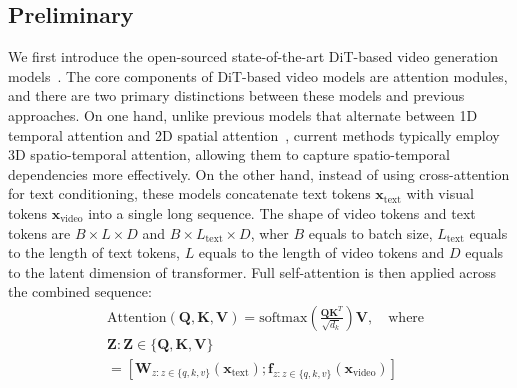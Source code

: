 \subsection{Preliminary}
We first introduce the open-sourced state-of-the-art DiT-based video generation models~\cite{yang2024cogvideox,genmo2024mochi}.
The core components of DiT-based video models are attention modules, and there are two primary distinctions between these models and previous approaches.
On one hand, unlike previous models that alternate between 1D temporal attention and 2D spatial attention~\cite{cerspense2023zeroscope, chen2023videocrafter1, chen2024videocrafter2, opensora}, current methods typically employ 3D spatio-temporal attention, allowing them to capture spatio-temporal dependencies more effectively.
On the other hand, instead of using cross-attention for text conditioning, these models concatenate text tokens \( \mathbf{x}_{\text{text}} \) with visual tokens \( \mathbf{x}_{\text{video}} \) into a single long sequence. 
The shape of video tokens and text tokens are \(B\times L\times D\) and \(B\times L_{\text{text}}\times D\), wher \(B\) equals to batch size, \(L_{\text{text}}\) equals to the length of text tokens, \(L\) equals to the length of video tokens and \(D\) equals to the latent dimension of transformer.
Full self-attention is then applied across the combined sequence:
\begin{equation}
\begin{aligned}
    &\text{Attention}(\mathbf{Q}, \mathbf{K}, \mathbf{V}) = \text{softmax}\left(\frac{\mathbf{Q}\mathbf{K}^T}{\sqrt{d_k}}\right)\mathbf{V}, \quad \text{where} \\
&\mathbf{Z : Z \in \{Q, K, V\}} \\&= [\mathbf{W}_{z : z \in \{q, k, v\}}(\mathbf{x}_{\text{text}}); \mathbf{f}_{z : z \in \{q, k, v\}}(\mathbf{x}_{\text{video}})]
\end{aligned}
\label{SA}
\end{equation}


